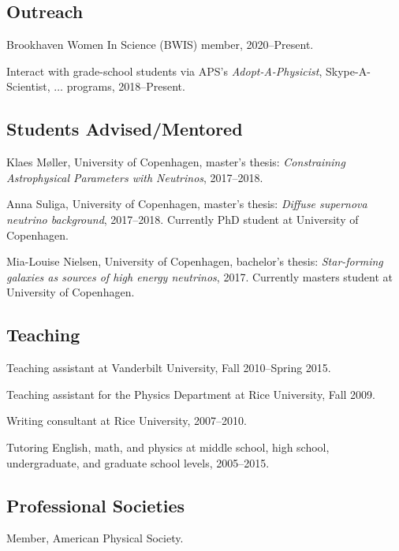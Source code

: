 \documentclass{article}
\renewenvironment{itemize}{
\begin{list}{}{
\setlength{\leftmargin}{.5em}}}{
\end{list}}
\begin{document}
\subsection*{Outreach}
\begin{itemize}
\item Brookhaven Women In Science (BWIS) member, 2020--Present.
\item Interact with grade-school students via APS's \emph{Adopt-A-Physicist}, Skype-A-Scientist, $\dots$ programs, 2018--Present.
\end{itemize}

\subsection*{Students Advised/Mentored}
\begin{itemize}
\item Klaes M\o ller, University of Copenhagen, master's thesis: \emph{Constraining Astrophysical Parameters with Neutrinos}, 2017--2018.
\item Anna Suliga, University of Copenhagen, master's thesis: \emph{Diffuse supernova neutrino background}, 2017--2018.
Currently PhD student at University of Copenhagen.
\item Mia-Louise Nielsen, University of Copenhagen, bachelor's thesis: \emph{Star-forming galaxies as sources of high energy neutrinos}, 2017.
Currently masters student at University of Copenhagen.
\end{itemize}

\subsection*{Teaching}
\begin{itemize}
\item Teaching assistant at Vanderbilt University, Fall 2010--Spring 2015.
\item Teaching assistant for the Physics Department at Rice University, Fall 2009.
\item Writing consultant at Rice University, 2007--2010.
\item Tutoring English, math, and physics at middle school, high school, undergraduate, and graduate school levels, 2005--2015.
\end{itemize}

\subsection*{Professional Societies}
\begin{itemize}
\item Member, American Physical Society.
\end{itemize}
\end{document}
